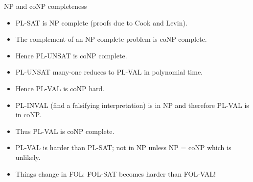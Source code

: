 \documentclass[style=sailor,size=12pt]{powerdot}
\begin{document}
\begin{wideslide}[bm=,toc=]{NP and coNP completeness}
\begin{itemize}
\item PL-SAT is NP complete (proofs due to Cook and Levin).
\item The complement of an NP-complete problem is coNP complete.
\item Hence PL-UNSAT is coNP complete.
\item PL-UNSAT many-one reduces to PL-VAL in polynomial time.
\item Hence PL-VAL is coNP hard.
\item PL-INVAL (find a falsifying interpretation) is in NP and therefore PL-VAL is in coNP.
\item Thus PL-VAL is coNP complete.
\item PL-VAL is harder than PL-SAT; not in NP unless NP = coNP which is unlikely.
\item Things change in FOL: FOL-SAT becomes harder than FOL-VAL!
\end{itemize}
\end{wideslide}
\end{document}
